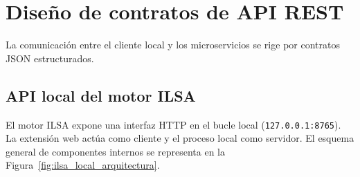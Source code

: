 \section{Diseño de contratos de API REST}

La comunicación entre el cliente local y los microservicios se rige por contratos JSON estructurados.

\subsection{API local del motor ILSA}
El motor ILSA expone una interfaz HTTP en el bucle local (\texttt{127.0.0.1:8765}). La extensión web actúa como cliente y el proceso local como servidor. El esquema general de componentes internos se representa en la Figura~\ref{fig:ilsa_local_arquitectura}.

